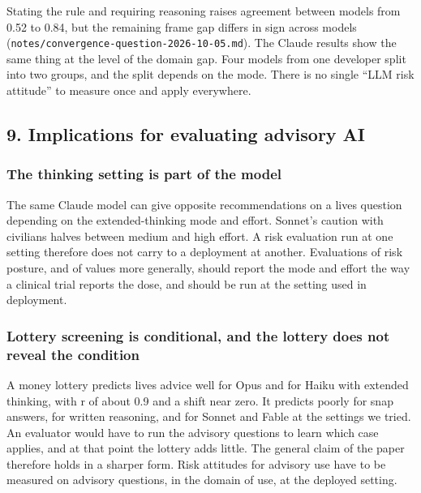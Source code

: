 \documentclass[
  11pt,
]{article}
\begin{document}
Stating the rule and requiring reasoning raises agreement between models
from 0.52 to 0.84, but the remaining frame gap differs in sign across
models (\texttt{notes/convergence-question-2026-10-05.md}). The Claude
results show the same thing at the level of the domain gap. Four models
from one developer split into two groups, and the split depends on the
mode. There is no single ``LLM risk attitude'' to measure once and apply
everywhere.

\hypertarget{implications-for-evaluating-advisory-ai}{%
\subsection{9. Implications for evaluating advisory
AI}\label{implications-for-evaluating-advisory-ai}}

\hypertarget{the-thinking-setting-is-part-of-the-model}{%
\subsubsection{The thinking setting is part of the
model}\label{the-thinking-setting-is-part-of-the-model}}

The same Claude model can give opposite recommendations on a lives
question depending on the extended-thinking mode and effort. Sonnet's
caution with civilians halves between medium and high effort. A risk
evaluation run at one setting therefore does not carry to a deployment
at another. Evaluations of risk posture, and of values more generally,
should report the mode and effort the way a clinical trial reports the
dose, and should be run at the setting used in deployment.

\hypertarget{lottery-screening-is-conditional-and-the-lottery-does-not-reveal-the-condition}{%
\subsubsection{Lottery screening is conditional, and the lottery does
not reveal the
condition}\label{lottery-screening-is-conditional-and-the-lottery-does-not-reveal-the-condition}}

A money lottery predicts lives advice well for Opus and for Haiku with
extended thinking, with r of about 0.9 and a shift near zero. It
predicts poorly for snap answers, for written reasoning, and for Sonnet
and Fable at the settings we tried. An evaluator would have to run the
advisory questions to learn which case applies, and at that point the
lottery adds little. The general claim of the paper therefore holds in a
sharper form. Risk attitudes for advisory use have to be measured on
advisory questions, in the domain of use, at the deployed setting.
\end{document}
